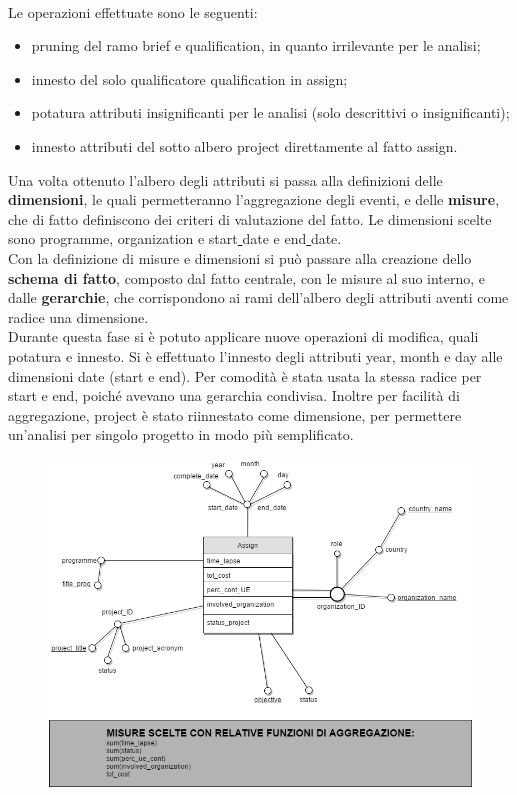 \documentclass[12pt,a4paper]{report}
\begin{document}
\\Le operazioni effettuate sono le seguenti:
\begin{itemize}
	\item pruning del ramo brief e qualification, in quanto irrilevante per le analisi;
	\item innesto del solo qualificatore qualification in assign;
	\item potatura attributi insignificanti per le analisi (solo descrittivi o insignificanti);
	\item innesto attributi del sotto albero project direttamente al fatto assign.
\end{itemize}
\vspace*{1cm}
Una volta ottenuto l'albero degli attributi si passa alla definizioni delle \textbf{dimensioni}, le quali permetteranno l'aggregazione degli eventi, e delle \textbf{misure}, che di fatto definiscono dei criteri di valutazione del fatto.
Le dimensioni scelte sono programme, organization e start\underline{ }date e end\underline{ }date.
\\\noindent Con la definizione di misure e dimensioni si può passare alla creazione dello \textbf{schema di fatto}, composto dal fatto centrale, con le misure al suo interno, e dalle \textbf{gerarchie}, che corrispondono ai rami dell'albero degli attributi aventi come radice una dimensione.
\vspace*{2cm}
\\Durante questa fase si è potuto applicare nuove operazioni di modifica, quali potatura e innesto. Si è effettuato l'innesto degli attributi year, month e day alle dimensioni date (start e end). Per comodità è stata usata la stessa radice per start e end, poiché avevano una gerarchia condivisa. Inoltre per facilità di aggregazione, project è stato riinnestato come dimensione, per permettere un'analisi per singolo progetto in modo più semplificato.
\begin{figure}[htbp]
	\centering
	\includegraphics[scale=0.70]{Fact_Scheme}
\end{figure}
\end{document}
